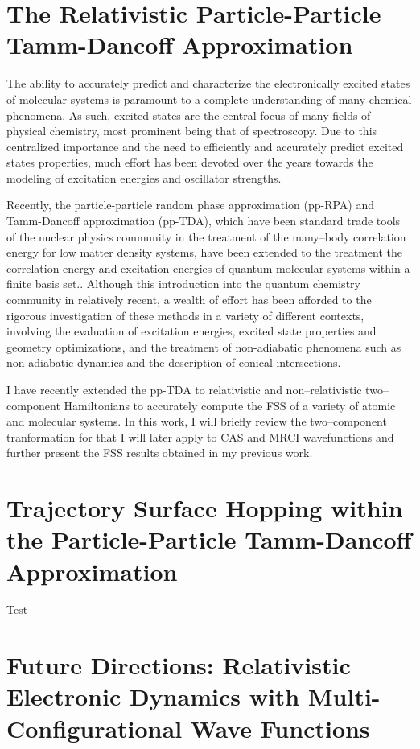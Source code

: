 \documentclass[12pt]{article}
\begin{document}
\section{The Relativistic Particle-Particle Tamm-Dancoff Approximation}
\label{sec:pp-X2C}

The ability to accurately predict and characterize the electronically excited
states of molecular systems is paramount to a complete understanding of many
chemical phenomena. As such, excited states are the central focus of many
fields of physical chemistry, most prominent being that of spectroscopy. Due to
this centralized importance and the need to efficiently and accurately predict
excited states properties, much  effort has been devoted over the years towards
the modeling of excitation energies and oscillator strengths.

Recently, the particle-particle random phase approximation (pp-RPA) and
Tamm-Dancoff approximation (pp-TDA), which have been standard trade tools of
the nuclear physics community in the treatment of the many--body correlation
energy for low matter density systems\cite{SchuckBook_04}, have been extended
to the treatment the correlation energy and excitation energies of quantum
molecular systems within a finite basis set.\cite{Yang13_224105,Yang13_18A522,
Yang13_174110,Yang13_104112,Yang13_030501,Yang09_066403,Bulik13_104113}.
Although this introduction into the quantum chemistry community in relatively
recent, a wealth of effort has been afforded to the rigorous investigation of
these methods in a variety of different contexts, involving the evaluation of
excitation energies\cite{Yang13_224105,Yang13_18A522,Yang13_174110}, excited
state properties and geometry optimizations\cite{Yang15_1025}, and the
treatment of non-adiabatic phenomena such as non-adiabatic
dynamics\cite{DBWY16_Submitted1,Liu14_244105}  and the description of conical
intersections\cite{Yang16_2407}.

I have recently extended the pp-TDA to relativistic and non--relativistic
two--component Hamiltonians\cite{DBWY16_Accepted1} to accurately compute the
FSS of a variety of atomic and molecular systems. In this work, I will briefly
review the two--component tranformation for that I will later apply to CAS and
MRCI wavefunctions and further present the FSS results obtained in my previous
work.  

\section{Trajectory Surface Hopping within the Particle-Particle Tamm-Dancoff Approximation}
\label{sec:pp-TSH}
Test\cite{DBWY16_JCTC935,DBWY16_Accepted1,DBWY16_Submitted1,DBWY16_Submitted2}

\section{Future Directions: Relativistic Electronic Dynamics with Multi-Configurational Wave Functions}
\label{sec:Future}


\end{document}
